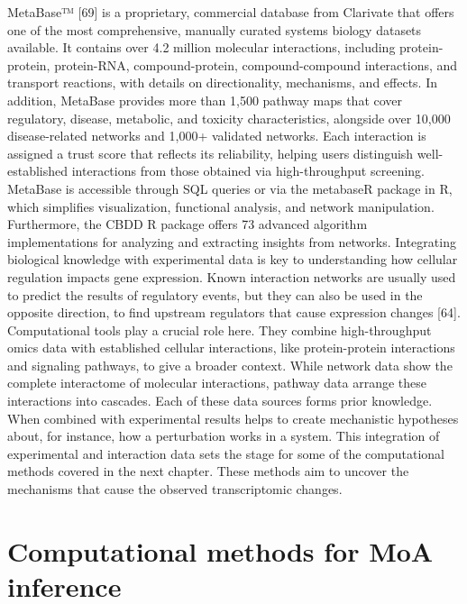 MetaBase™ [69] is a proprietary, commercial database from Clarivate that offers one of the most comprehensive, manually curated systems biology datasets available. It contains over 4.2 million molecular interactions, including protein-protein, protein-RNA, compound-protein, compound-compound interactions, and transport reactions, with details on directionality, mechanisms, and effects. In addition, MetaBase provides more than 1,500 pathway maps that cover regulatory, disease, metabolic, and toxicity characteristics, alongside over 10,000 disease-related networks and 1,000+ validated networks. Each interaction is assigned a trust score that reflects its reliability, helping users distinguish well-established interactions from those obtained via high-throughput screening. MetaBase is accessible through SQL queries or via the metabaseR package in R, which simplifies visualization, functional analysis, and network manipulation. Furthermore, the CBDD R package offers 73 advanced algorithm implementations for analyzing and extracting insights from networks.
Integrating biological knowledge with experimental data is key to understanding how cellular regulation impacts gene expression.  Known interaction networks are usually used to predict the results of regulatory events, but they can also be used in the opposite direction, to find upstream regulators that cause expression changes [64]. Computational tools play a crucial role here. They combine high-throughput omics data with established cellular interactions, like protein-protein interactions and signaling pathways, to give a broader context. While network data show the complete interactome of molecular interactions, pathway data arrange these interactions into cascades. Each of these data sources forms prior knowledge. When combined with experimental results helps to create mechanistic hypotheses about, for instance, how a perturbation works in a system. This integration of experimental and interaction data sets the stage for some of the computational methods covered in the next chapter. These methods aim to uncover the mechanisms that cause the observed transcriptomic changes.

\section{Computational methods for MoA inference} %
\label{sec:Computational_methods_for_MoA_inference}

